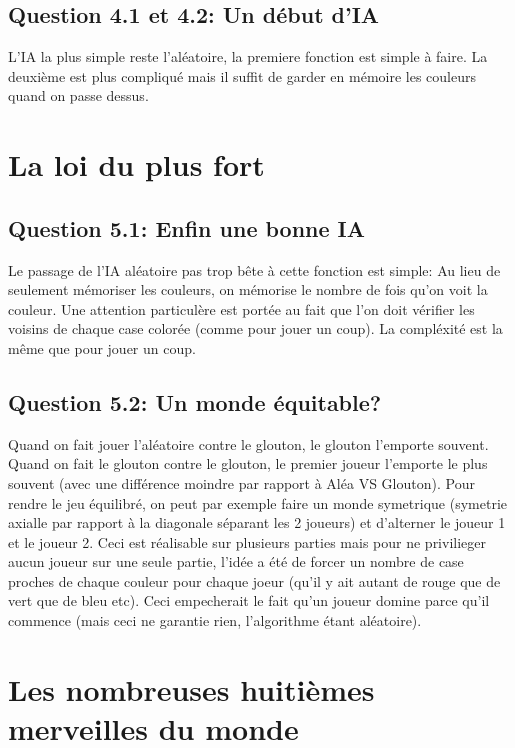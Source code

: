 \documentclass[11pt]{article}
\begin{document}
    \subsection{Question 4.1 et 4.2: Un début d'IA}

    L'IA la plus simple reste l'aléatoire, la premiere fonction est simple à faire. La deuxième est plus compliqué mais il suffit de garder en mémoire les couleurs quand on passe dessus.

    \section{La loi du plus fort}

    \subsection{Question 5.1: Enfin une bonne IA}

    Le passage de l'IA aléatoire pas trop bête à cette fonction est simple: Au lieu de seulement mémoriser les couleurs, on mémorise le nombre de fois qu'on voit la couleur. Une attention particulère est portée au fait que l'on doit vérifier les voisins de chaque case colorée (comme pour jouer un coup). La compléxité est la même que pour jouer un coup.

    \subsection{Question 5.2: Un monde équitable?}

    Quand on fait jouer l'aléatoire contre le glouton, le glouton l'emporte souvent. Quand on fait le glouton contre le glouton, le premier joueur l'emporte le plus souvent (avec une différence moindre par rapport à Aléa VS Glouton). Pour rendre le jeu équilibré, on peut par exemple faire un monde symetrique (symetrie axialle par rapport à la diagonale séparant les 2 joueurs) et d'alterner le joueur 1 et le joueur 2. Ceci est réalisable sur plusieurs parties mais pour ne privilieger aucun joueur sur une seule partie, l'idée a été de forcer un nombre de case proches de chaque couleur pour chaque joeur (qu'il y ait autant de rouge que de vert que de bleu etc). Ceci empecherait le fait qu'un joueur domine parce qu'il commence (mais ceci ne garantie rien, l'algorithme étant aléatoire).

    \section{Les nombreuses huitièmes merveilles du monde}
\end{document}
